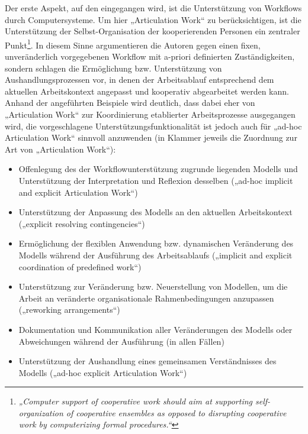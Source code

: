 Der erste Aspekt, auf den eingegangen wird, ist die Unterstützung von Workflows durch Computersysteme. Um hier „Articulation Work“ zu berücksichtigen, ist die Unterstützung der Selbst-Organisation der kooperierenden Personen ein zentraler Punkt\footnote{\emph{„Computer support of cooperative work should aim at supporting self-organization of cooperative ensembles as opposed to disrupting cooperative work by computerizing formal procedures.“}\citep[][S. 17]{Schmidt92}}. In diesem Sinne argumentieren die Autoren gegen einen fixen, unveränderlich vorgegebenen Workflow mit a-priori definierten Zuständigkeiten, sondern schlagen die Ermöglichung bzw. Unterstützung von Aushandlungsprozessen vor, in denen der Arbeitsablauf entsprechend dem aktuellen Arbeitskontext angepasst und kooperativ abgearbeitet werden kann. Anhand der angeführten Beispiele wird deutlich, dass dabei eher von „Articulation Work“ zur Koordinierung etablierter Arbeitsprozesse ausgegangen wird, die vorgeschlagene Unterstützungsfunktionalität ist jedoch auch für „ad-hoc Articulation Work“ sinnvoll anzuwenden (in Klammer jeweils die Zuordnung zur Art von „Articulation Work“):
\begin{itemize}
	\item Offenlegung des der Workflowunterstützung zugrunde liegenden Modells und Unterstützung der Interpretation und Reflexion desselben („ad-hoc implicit and explicit Articulation Work“)
	\item Unterstützung der Anpassung des Modells an den aktuellen Arbeitskontext („explicit resolving contingencies“)
	\item Ermöglichung der flexiblen Anwendung bzw. dynamischen Veränderung des Modells während der Ausführung des Arbeitsablaufs („implicit and explicit coordination of predefined work“)
	\item Unterstützung zur Veränderung bzw. Neuerstellung von Modellen, um die Arbeit an veränderte organisationale Rahmenbedingungen anzupassen („reworking arrangements“)
	\item Dokumentation und Kommunikation aller Veränderungen des Modells oder Abweichungen während der Ausführung (in allen Fällen)
	\item Unterstützung der Aushandlung eines gemeinsamen Verständnisses des Modells („ad-hoc explicit Articulation Work“)
\end{itemize}

